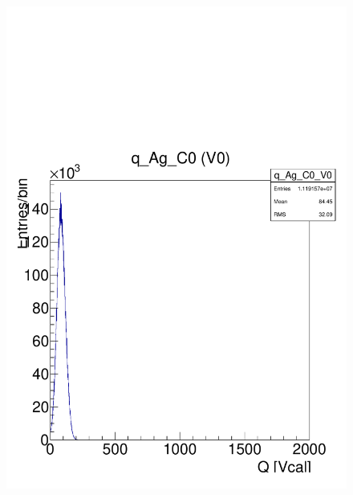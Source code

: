 \documentclass[a4paper,12pt,twoside]{article}
\begin{document}
\begin{figure} [h!]
\begin{minipage}{.48\textwidth}
  \includegraphics[width=\textwidth]{./Figures/HRData_q_histo.pdf}
  \label{HRData-Qhisto}
\end{minipage}
\end{figure}
\end{document}
